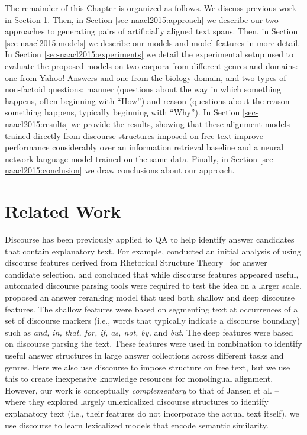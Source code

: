 The remainder of this Chapter is organized as follows.  We discuss previous work in Section \ref{sec-naacl2015:relatedwork}.  Then, in Section \ref{sec-naacl2015:approach} we describe our two approaches to generating pairs of artificially aligned text spans.  Then, in Section \ref{sec-naacl2015:models} we describe our models and model features in more detail.  In Section \ref{sec-naacl2015:experiments} we detail the experimental setup used to evaluate the proposed models on two corpora from different genres and domains: one from Yahoo! Answers and one from the biology domain, and two types of non-factoid questions: manner (questions about the way in which something happens, often beginning with ``How'') and reason (questions about the reason something happens, typically beginning with ``Why'').  In Section \ref{sec-naacl2015:results} we provide the results, showing that these alignment models trained directly from discourse structures imposed on free text
improve performance considerably over an information retrieval baseline and a neural network language model trained on the same data.  Finally, in Section \ref{sec-naacl2015:conclusion} we draw conclusions about our approach.


\section{Related Work}
\label{sec-naacl2015:relatedwork}
Discourse has been previously applied to QA to help identify answer candidates that contain explanatory text.  For example, \citet{Verberne:2007} conducted an initial analysis of using discourse features derived from Rhetorical Structure Theory~\citep[RST;][]{mann88} for answer candidate selection, and concluded that while discourse features appeared useful, automated discourse parsing tools were required to test the idea on a larger scale.  
\citet{jansen14} proposed an answer reranking model that used both shallow and deep discourse features.  The shallow features were based on segmenting text at occurrences of a set of discourse markers \citep{marcu97} (i.e., words that typically indicate a discourse boundary) such as \textit{and, in, that, for, if, as, not, by,} and \textit{but}.  The deep features were based on discourse parsing the text.  These features were used in combination to identify useful answer structures in large answer collections across different tasks and genres.  Here we also use discourse to impose structure on free text, but we use this to create inexpensive knowledge resources for monolingual alignment. However, our work is conceptually \textit{complementary} to that of Jansen et al. -- where they explored largely unlexicalized discourse structures to identify explanatory text (i.e., their features do not incorporate the actual text itself), we use discourse to learn lexicalized models that encode semantic similarity.

